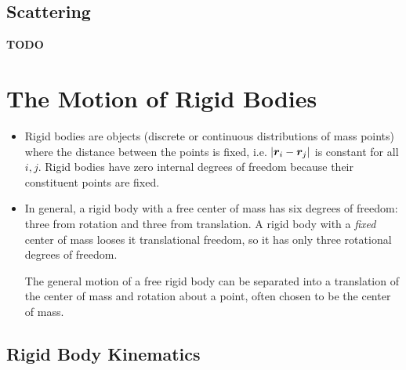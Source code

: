 \documentclass[11pt, a4paper]{article}
\begin{document}
\subsection{Scattering}
\textbf{TODO}



\newpage
\section{The Motion of Rigid Bodies}

\begin{itemize}
	\item Rigid bodies are objects (discrete or continuous distributions of mass points) where the distance between the points is fixed, i.e. $ \abs{\bm{r}_{i} - \bm{r}_{j} } $ is constant for all $ i, j $. Rigid bodies have zero internal degrees of freedom because their constituent points are fixed.
	
	\item In general, a rigid body with a free center of mass has six degrees of freedom: three from rotation and three from translation. A rigid body with a \textit{fixed} center of mass looses it translational freedom, so it has only three rotational degrees of freedom.

	The general motion of a free rigid body can be separated into a translation of the center of mass and rotation about a point, often chosen to be the center of mass.
	
\end{itemize} 

\subsection{Rigid Body Kinematics}
\end{document}
